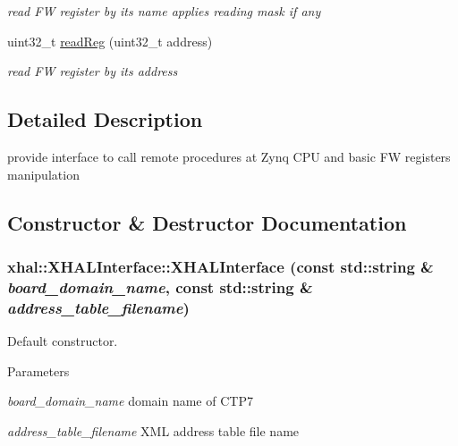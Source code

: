 \begin{DoxyCompactItemize}
\begin{DoxyCompactList}\small\item\em read FW register by its name applies reading mask if any \item\end{DoxyCompactList}\item 
\hypertarget{classxhal_1_1XHALInterface_a1e3b29169f1bc6c13e469cd186fc662f}{
uint32\_\-t \hyperlink{classxhal_1_1XHALInterface_a1e3b29169f1bc6c13e469cd186fc662f}{readReg} (uint32\_\-t address)}
\label{classxhal_1_1XHALInterface_a1e3b29169f1bc6c13e469cd186fc662f}

\begin{DoxyCompactList}\small\item\em read FW register by its address \item\end{DoxyCompactList}\end{DoxyCompactItemize}


\subsection{Detailed Description}
provide interface to call remote procedures at Zynq CPU and basic FW registers manipulation 

\subsection{Constructor \& Destructor Documentation}
\hypertarget{classxhal_1_1XHALInterface_ac44129acadc38854d639e1dfa6fd6d92}{
\subsubsection[{XHALInterface}]{\setlength{\rightskip}{0pt plus 5cm}xhal::XHALInterface::XHALInterface (const std::string \& {\em board\_\-domain\_\-name}, \/  const std::string \& {\em address\_\-table\_\-filename})}}
\label{classxhal_1_1XHALInterface_ac44129acadc38854d639e1dfa6fd6d92}


Default constructor. 
\begin{DoxyParams}{Parameters}
\item[{\em board\_\-domain\_\-name}]domain name of CTP7 \item[{\em address\_\-table\_\-filename}]XML address table file name \end{DoxyParams}


